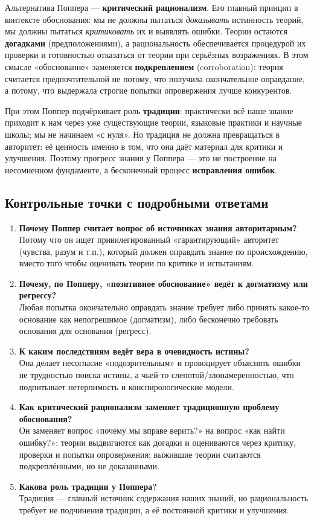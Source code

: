 \documentclass[a4paper,12pt]{article}
\begin{document}
Альтернатива Поппера --- \textbf{критический рационализм}. Его главный принцип в контексте обоснования: мы не должны пытаться \emph{доказывать} истинность теорий, мы должны пытаться \emph{критиковать} их и выявлять ошибки. Теории остаются \textbf{догадками} (предположениями), а рациональность обеспечивается процедурой их проверки и готовностью отказаться от теории при серьёзных возражениях. В этом смысле «обоснование» заменяется \textbf{подкреплением} (corroboration): теория считается предпочтительной не потому, что получила окончательное оправдание, а потому, что выдержала строгие попытки опровержения лучше конкурентов.

При этом Поппер подчёркивает роль \textbf{традиции}: практически всё наше знание приходит к нам через уже существующие теории, языковые практики и научные школы; мы не начинаем «с нуля». Но традиция не должна превращаться в авторитет: её ценность именно в том, что она даёт материал для критики и улучшения. Поэтому прогресс знания у Поппера --- это не построение на несомненном фундаменте, а бесконечный процесс \textbf{исправления ошибок}.

\subsection{Контрольные точки с подробными ответами}

\begin{enumerate}
    \item \textbf{Почему Поппер считает вопрос об источниках знания авторитарным?}\\
    Потому что он ищет привилегированный «гарантирующий» авторитет (чувства, разум и т.п.), который должен оправдать знание по происхождению, вместо того чтобы оценивать теории по критике и испытаниям.
    \item \textbf{Почему, по Попперу, «позитивное обоснование» ведёт к догматизму или регрессу?}\\
    Любая попытка окончательно оправдать знание требует либо принять какое-то основание как непогрешимое (догматизм), либо бесконечно требовать основания для основания (регресс).
    \item \textbf{К каким последствиям ведёт вера в очевидность истины?}\\
    Она делает несогласие «подозрительным» и провоцирует объяснять ошибки не трудностью поиска истины, а чьей-то слепотой/злонамеренностью, что подпитывает нетерпимость и конспирологические модели.
    \item \textbf{Как критический рационализм заменяет традиционную проблему обоснования?}\\
    Он заменяет вопрос «почему мы вправе верить?» на вопрос «как найти ошибку?»: теории выдвигаются как догадки и оцениваются через критику, проверки и попытки опровержения; выжившие теории считаются подкреплёнными, но не доказанными.
    \item \textbf{Какова роль традиции у Поппера?}\\
    Традиция --- главный источник содержания наших знаний, но рациональность требует не подчинения традиции, а её постоянной критики и улучшения.
\end{enumerate}
\end{document}
